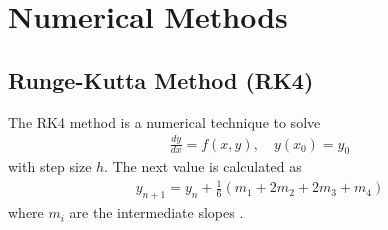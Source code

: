 \documentclass[conference]{IEEEtran}
\begin{document}
\appendices
\section{Numerical Methods}

\subsection{Runge-Kutta Method (RK4)}
\label{appendix:rk4}
The RK4 method is a numerical technique to solve
\begin{align}
\frac{dy}{dx} = f(x,y), \quad y(x_0)=y_0
\end{align}
with step size $h$. The next value is calculated as
\begin{align}
y_{n+1} = y_n + \frac{1}{6}(m_1 + 2 m_2 + 2 m_3 + m_4)
\end{align}
where $m_i$ are the intermediate slopes
\cite{grewal2014}.

\end{document}
